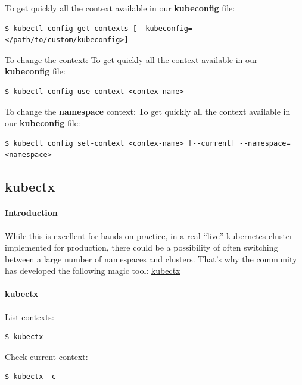\documentclass{article}
\newenvironment{codetemplate}[1][]{%
  \mybasecolorbox[#1]
  \itshape
}{%
  \endmybasecolorbox
}
\begin{document}
To get quickly all the context available in our \textbf{kubeconfig} file:
\begin{codetemplate}{}
\begin{verbatim}
$ kubectl config get-contexts [--kubeconfig=</path/to/custom/kubeconfig>]
\end{verbatim}
\end{codetemplate}

To change the context:
To get quickly all the context available in our \textbf{kubeconfig} file:
\begin{codetemplate}{}
\begin{verbatim}
$ kubectl config use-context <contex-name>
\end{verbatim}
\end{codetemplate}

To change the \textbf{namespace} context:
To get quickly all the context available in our \textbf{kubeconfig} file:
\begin{codetemplate}{}
\begin{verbatim}
$ kubectl config set-context <contex-name> [--current] --namespace=<namespace>
\end{verbatim}
\end{codetemplate}

\subsection{kubectx}
\paragraph{Introduction}
While this is excellent for hands-on practice, in a real “live” kubernetes cluster implemented for production, there could be a possibility of often switching between a large number of namespaces and clusters.
That's why the community has developed the following magic tool: \href{https://github.com/ahmetb/kubectx}{kubectx}

\paragraph{kubectx}
List contexts:
\begin{codetemplate}{}
\begin{verbatim}
$ kubectx
\end{verbatim}
\end{codetemplate}

Check current context:
\begin{codetemplate}{}
\begin{verbatim}
$ kubectx -c
\end{verbatim}
\end{codetemplate}
\end{document}
